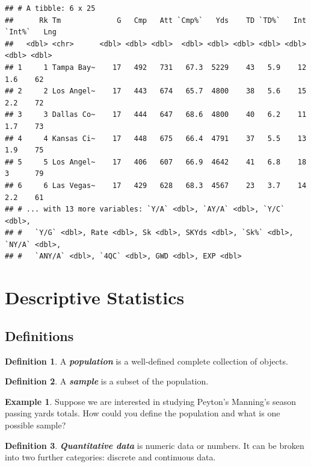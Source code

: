 \documentclass[
  11pt,
]{book}
\theoremstyle{definition}
\newtheorem{definition}{Definition}[chapter]
\theoremstyle{definition}
\newtheorem{example}{Example}[chapter]
\theoremstyle{definition}
\theoremstyle{definition}
\theoremstyle{remark}
\begin{document}
\begin{verbatim}
## # A tibble: 6 x 25
##      Rk Tm             G   Cmp   Att `Cmp%`   Yds    TD `TD%`   Int `Int%`   Lng
##   <dbl> <chr>      <dbl> <dbl> <dbl>  <dbl> <dbl> <dbl> <dbl> <dbl>  <dbl> <dbl>
## 1     1 Tampa Bay~    17   492   731   67.3  5229    43   5.9    12    1.6    62
## 2     2 Los Angel~    17   443   674   65.7  4800    38   5.6    15    2.2    72
## 3     3 Dallas Co~    17   444   647   68.6  4800    40   6.2    11    1.7    73
## 4     4 Kansas Ci~    17   448   675   66.4  4791    37   5.5    13    1.9    75
## 5     5 Los Angel~    17   406   607   66.9  4642    41   6.8    18    3      79
## 6     6 Las Vegas~    17   429   628   68.3  4567    23   3.7    14    2.2    61
## # ... with 13 more variables: `Y/A` <dbl>, `AY/A` <dbl>, `Y/C` <dbl>,
## #   `Y/G` <dbl>, Rate <dbl>, Sk <dbl>, SKYds <dbl>, `Sk%` <dbl>, `NY/A` <dbl>,
## #   `ANY/A` <dbl>, `4QC` <dbl>, GWD <dbl>, EXP <dbl>
\end{verbatim}

\newpage

\hypertarget{descriptive-statistics}{%
\section{Descriptive Statistics}\label{descriptive-statistics}}

\hypertarget{definitions}{%
\subsection{Definitions}\label{definitions}}

\begin{definition}
A \textbf{\emph{population}} is a well-defined complete collection of objects.
\end{definition}

\begin{definition}
A \textbf{\emph{sample}} is a subset of the population.
\end{definition}

\begin{example}
Suppose we are interested in studying Peyton's Manning's season passing yards totals. How could you define the population and what is one possible sample?
\end{example}

\hfill\break
\hfill\break
\hfill\break
\hfill\break
\hfill\break

\begin{definition}
\textbf{\emph{Quantitative data}} is numeric data or numbers. It can be broken into two further categories: discrete and continuous data.
\end{definition}
\end{document}
